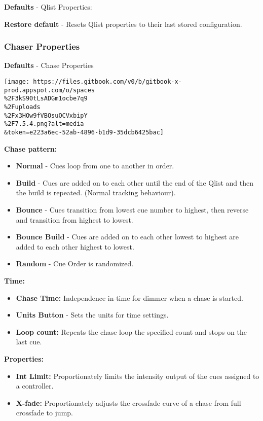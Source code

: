 \documentclass[
]{article}
\begin{document}
\textbf{Defaults} - Qlist Properties:

\textbf{Restore default} - Resets Qlist properties to their last stored configuration.

\hypertarget{chaser-properties}{%
\subsubsection{Chaser Properties}\label{chaser-properties}}

\textbf{Defaults} - Chase Properties

\texttt{[image: https://files.gitbook.com/v0/b/gitbook-x-prod.appspot.com/o/spaces\\\%2F3kS90tLsADGm1ocbe7q9\\\%2Fuploads\\\%2Fx3HOw9fVBOsuOCVxbipY\\\%2F7.5.4.png?alt=media\\\&token=e223a6ec-52ab-4896-b1d9-35dcb6425bac]}

\textbf{Chase pattern:}

\begin{itemize}
\item
  \textbf{Normal} - Cues loop from one to another in order.
\item
  \textbf{Build} - {Cues are added on to each other until the end of the Qlist and then the build is repeated. (Normal tracking behaviour).}
\item
  \textbf{Bounce} - Cues transition from lowest cue number to highest, then reverse and transition from highest to lowest.
\item
  \textbf{Bounce Build} - {Cues are added on to each other lowest to highest are added to each other highest to lowest.}
\item
  \textbf{Random} - Cue Order is randomized.
\end{itemize}

\textbf{Time:}

\begin{itemize}
\item
  \textbf{Chase Time:} { Independence in-time for dimmer when a chase is started.}
\item
  \textbf{Units Button} - {Sets the units for time settings.}
\item
  \textbf{Loop count:} {Repeats the chase loop the specified count and stops on the last cue.}
\end{itemize}

\textbf{Properties:}

\begin{itemize}
\item
  \textbf{Int Limit:} Proportionately limits the intensity output of the cues assigned to a controller.
\item
  \textbf{X-fade:} Proportionately adjusts the crossfade curve of a chase from full crossfade to jump.
\end{itemize}
\end{document}
